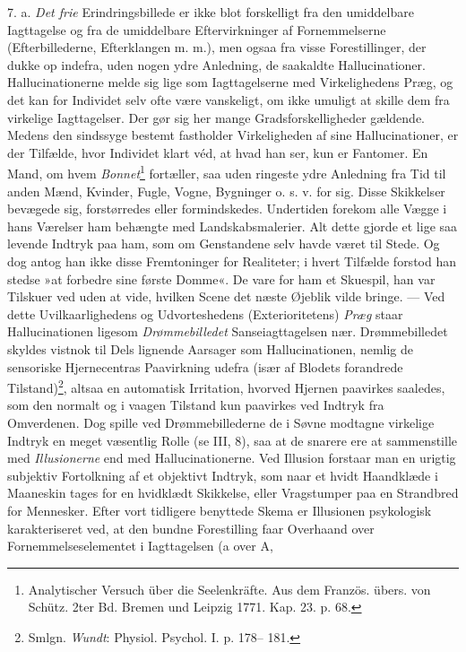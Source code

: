 \documentclass[12pt,a4paper,openany]{book}
\newcommand{\opage}[1]{\marginnote{\footnotesize\textit{[#1]}}}
\begin{document}
7. a. \emph{Det frie} Erindringsbillede er ikke blot forskelligt fra den
umiddelbare Iagttagelse og fra de umiddelbare Eftervirkninger af
Fornemmelserne (Efterbillederne, Efterklangen m. m.), men ogsaa fra
visse Forestillinger, der dukke op indefra, uden nogen ydre Anledning,
de saakaldte Hallucinationer. Hallucinationerne melde sig lige som
Iagttagelserne med Virkelighedens Præg, og det kan for Individet selv
ofte være vanskeligt, om ikke umuligt at skille dem fra virkelige
Iagttagelser. Der gør sig her mange Gradsforskelligheder gældende.
Medens den sindssyge bestemt fastholder Virkeligheden af sine
Hallucinationer, er der Tilfælde, hvor Individet klart véd, at hvad han
ser, kun er Fantomer. En Mand, om hvem
\emph{Bonnet}\footnote[1]{Analytischer Versuch über die Seelenkräfte.
Aus dem Französ. übers. von Schütz. 2ter Bd. Bremen und Leipzig 1771.
Kap. 23. p. 68.} fortæller, saa uden ringeste ydre Anledning fra Tid til
anden Mænd, Kvinder, Fugle, Vogne, Bygninger o. s. v. for sig. Disse
Skikkelser bevægede sig, forstørredes eller formindskedes. Undertiden
forekom alle Vægge i hans Værelser ham behængte med Landskabsmalerier.
Alt dette gjorde et lige saa levende Indtryk paa ham, som om Genstandene
selv havde været til Stede. Og dog antog han ikke disse Fremtoninger for
Realiteter; i hvert Tilfælde forstod han stedse »at forbedre sine første
Domme«. De vare for ham et Skuespil, han var Tilskuer ved uden at vide,
hvilken Scene det næste Øjeblik vilde bringe. --- Ved dette
Uvilkaarlighedens og Udvorteshedens (Exterioritetens) \emph{Præg} staar
Hallucinationen ligesom \emph{Drømmebilledet} Sanseiagttagelsen nær.
Drømmebilledet skyldes vistnok til Dels lignende Aarsager som
Hallucinationen, nemlig de sensoriske Hjernecentras Paavirkning udefra
(især af Blodets forandrede Tilstand)\footnote[2]{Smlgn. \emph{Wundt}:
Physiol. Psychol. I. p. 178-- 181.}, altsaa en
\opage{177}automatisk Irritation, hvorved Hjernen paavirkes saaledes,
som den normalt og i vaagen Tilstand kun paavirkes ved Indtryk fra
Omverdenen. Dog spille ved Drømmebillederne de i Søvne modtagne
virkelige Indtryk en meget væsentlig Rolle (se III, 8), saa at de
snarere ere at sammenstille med \emph{Illusionerne} end med
Hallucinationerne. Ved Illusion forstaar man en urigtig subjektiv
Fortolkning af et objektivt Indtryk, som naar et hvidt Haandklæde i
Maaneskin tages for en hvidklædt Skikkelse, eller Vragstumper paa en
Strandbred for Mennesker. Efter vort tidligere benyttede Skema er
Illusionen psykologisk karakteriseret ved, at den bundne Forestilling
faar Overhaand over Fornemmelseselementet i Iagttagelsen (a over A,
\end{document}
